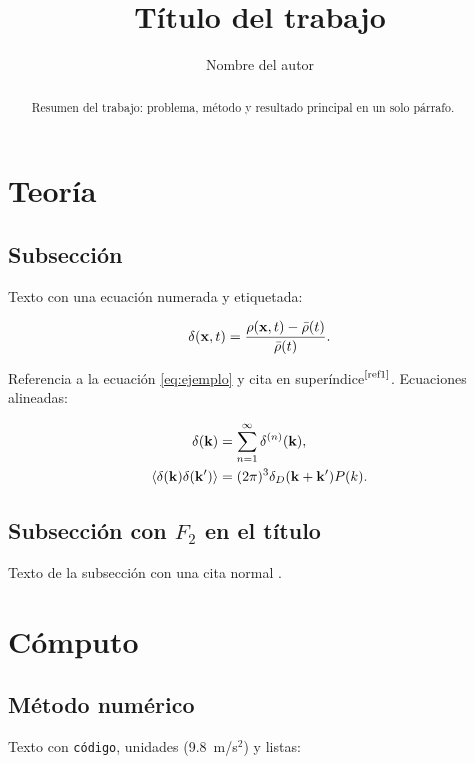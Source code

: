 \documentclass[letterpaper, 12pt]{article}
\title{Título del trabajo}
\author{Nombre del autor}
\newcommand{\un}[1]{\mbox{ #1}}
\newcommand{\upcite}[1]{\mbox{$^\text{\cite{#1}}$}}
\begin{document}

    \maketitle

    \begin{abstract}
        Resumen del trabajo: problema, método y resultado principal en un solo párrafo.
    \end{abstract}

    \unamindice

    \section{Teoría}
        \subsection{Subsección}
            Texto con una ecuación numerada y etiquetada:

            \begin{equation}\label{eq:ejemplo}
                \delta(\vb{x},t) = \frac{\rho(\vb{x},t) - \bar{\rho}(t)}{\bar{\rho}(t)}.
            \end{equation}

            Referencia a la ecuación \ref{eq:ejemplo} y cita en superíndice\upcite{ref1}. Ecuaciones alineadas:

            \begin{align}
                \delta(\vb{k}) &= \sum_{n=1}^{\infty} \delta^{(n)}(\vb{k}), \\
                \expval{\delta(\vb{k})\delta(\vb{k}')} &= (2\pi)^3 \delta_D(\vb{k}+\vb{k}') P(k).
            \end{align}

        \subsection{\texorpdfstring{Subsección con $F_2$ en el título}{Subsección con F2 en el título}}
            Texto de la subsección con una cita normal \cite{ref2}.

    \section{Cómputo}
        \subsection{Método numérico}
            Texto con \texttt{código}, unidades (9.8\un{m/s$^2$}) y listas:
\end{document}

